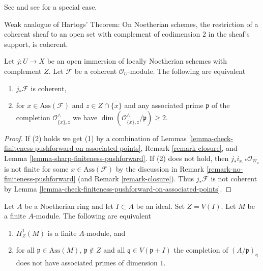 \begin{proposition}[Koll\'ar]
\label{proposition-kollar}
\begin{reference}
See \cite{k-coherent} and see \cite[IV, Proposition 7.2.2]{EGA}
for a special case.
\end{reference}
\begin{slogan}
Weak analogue of Hartogs' Theorem: On Noetherian schemes, the
restriction of a coherent sheaf to an open set with complement
of codimension 2 in the sheaf's support, is coherent.
\end{slogan}
Let $j : U \to X$ be an open immersion of locally Noetherian schemes
with complement $Z$. Let $\mathcal{F}$ be a coherent $\mathcal{O}_U$-module.
The following are equivalent
\begin{enumerate}
\item $j_*\mathcal{F}$ is coherent,
\item for $x \in \text{Ass}(\mathcal{F})$ and
$z \in Z \cap \overline{\{x\}}$ and any associated prime
$\mathfrak p$ of the completion $\mathcal{O}_{\overline{\{x\}}, z}^\wedge$
we have $\dim(\mathcal{O}_{\overline{\{x\}}, z}^\wedge/\mathfrak p) \geq 2$.
\end{enumerate}
\end{proposition}

\begin{proof}
If (2) holds we get (1) by a combination of
Lemmas \ref{lemma-check-finiteness-pushforward-on-associated-points},
Remark \ref{remark-closure}, and
Lemma \ref{lemma-sharp-finiteness-pushforward}.
If (2) does not hold, then $j_*i_{x, *}\mathcal{O}_{W_x}$ is not finite
for some $x \in \text{Ass}(\mathcal{F})$ by the discussion in
Remark \ref{remark-no-finiteness-pushforward}
(and Remark \ref{remark-closure}).
Thus $j_*\mathcal{F}$ is not coherent by
Lemma \ref{lemma-check-finiteness-pushforward-on-associated-points}.
\end{proof}

\begin{lemma}
\label{lemma-kollar-finiteness-H1-local}
Let $A$ be a Noetherian ring and let $I \subset A$ be an ideal.
Set $Z = V(I)$. Let $M$ be a finite $A$-module. The following
are equivalent
\begin{enumerate}
\item $H^1_Z(M)$ is a finite $A$-module, and
\item for all $\mathfrak p \in \text{Ass}(M)$, $\mathfrak p \not \in Z$
and all $\mathfrak q \in V(\mathfrak p + I)$ the completion of
$(A/\mathfrak p)_\mathfrak q$ does not have associated primes
of dimension $1$.
\end{enumerate}
\end{lemma}

